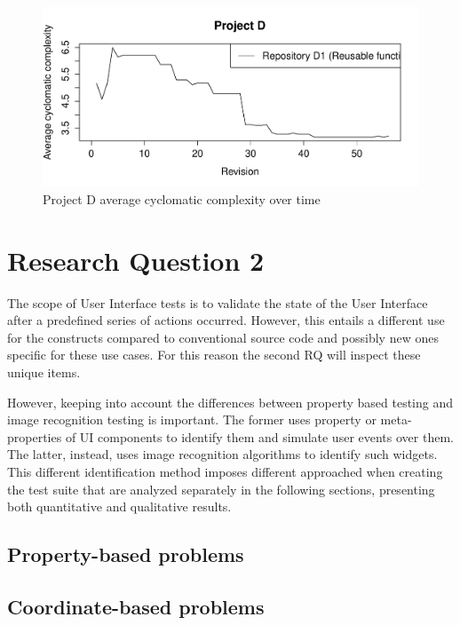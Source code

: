 \begin{figure}[H]
    \centering
    \includegraphics[width=\textwidth,keepaspectratio]{figure/results/rq1/project_d_avg_complexity.pdf}
    \caption{Project D average cyclomatic complexity over time}
    \label{fig:project_d_avg_complexity}
\end{figure}




\section{Research Question 2}

The scope of User Interface tests is to validate the state of the User Interface after a predefined series of actions occurred. However, this entails a different use for the constructs compared to conventional source code and possibly new ones specific for these use cases. For this reason the second RQ will inspect these unique items.

However, keeping into account the differences between property based testing and image recognition testing is important. The former uses property or meta-properties of UI components to identify them and simulate user events over them. The latter, instead, uses image recognition algorithms to identify such widgets. This different identification method imposes different approached when creating the test suite that are analyzed separately in the following sections, presenting both quantitative and qualitative results.


\subsection{Property-based problems}
    
    

\subsection{Coordinate-based problems}

